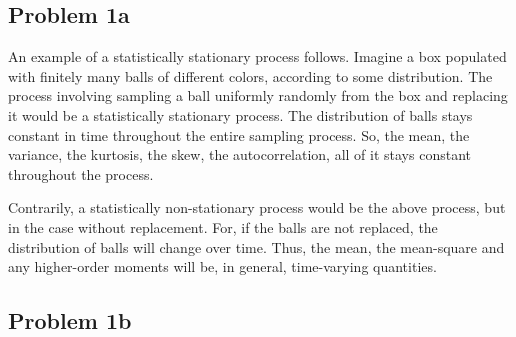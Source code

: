 \begin{homeworkProblem}

   \subsection{Problem 1a}

   An example of a statistically stationary process follows. Imagine a box
   populated with finitely many balls of different colors, according to some
   distribution. The process involving sampling a ball uniformly randomly from
   the box and replacing it would be a statistically stationary process. The
   distribution of balls stays constant in time throughout the entire sampling
   process. So, the mean, the variance, the kurtosis, the skew, the
   autocorrelation, all of it stays constant throughout the process.

   Contrarily, a statistically non-stationary process would be the above
   process, but in the case without replacement. For, if the balls are not
   replaced, the distribution of balls will change over time. Thus, the mean,
   the mean-square and any higher-order moments will be, in general,
   time-varying quantities.

   \subsection{Problem 1b}


\end{homeworkProblem}
